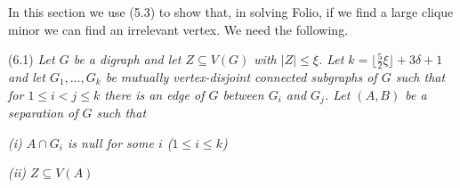 
In this section we use (5.3) to show that, in solving Folio, if we find a large clique minor we can find an irrelevant vertex. We need the following.

\stmt
(6.1) \textit{Let $G$ be a digraph and let $Z \subseteq V(G)$ with $|Z| \le \xi$. Let $k = \lfloor \frac{5}{2}\xi \rfloor + 3\delta + 1$ and let $G_1, \dots, G_k$ be mutually vertex-disjoint connected subgraphs of $G$ such that for $1 \le i < j \le k$ there is an edge of $G$ between $G_i$ and $G_j$. Let $(A, B)$ be a separation of $G$ such that}

\textit{(i) $A \cap G_i$ is null for some $i$ ($1 \le i \le k$)}

\textit{(ii) $Z \subseteq V(A)$}
